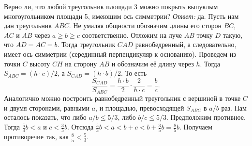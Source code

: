 \problem
Верно ли, что любой треугольник площади 3 можно покрыть выпуклым
многоугольником площади 5, имеющим ось симметрии?
\solution
\emph{Ответ:} да.
Пусть нам дан треугольник $ABC$.
Не умаляя общности обозначим длины его сторон $BC$, $AC$ и $AB$ через
$a \geq b \geq c$ соответственно.
Отложим на луче $AB$ точку $D$ такую, что $AD = AC = b$.
Тогда треугольник $CAD$ равнобедренный, а следовательно, имеет ось симметрии
(серединный перпендикуляр к основанию).
Проведем из точки $C$ высоту $CH$ на сторону $AB$ и обозначим её длину через
$h$.
Тогда $S_{ABC} = (h \cdot c) / 2$, а $S_{CAD} = (h \cdot b) / 2$.
То есть
\[
    \dfrac{S_{CAD}}{S_{ABC}}
=
    \dfrac{h \cdot b}{2} \cdot \dfrac{2}{h \cdot c}
=
    \dfrac{b}{c}
.\]
Аналогично можно построить равнобедренный треугольник с вершиной в точке $C$ и
двумя сторонами, равными $a$, и площадью, превосходящей $S_{ABC}$ в
$a / b$ раз.
Нам осталось показать, что либо $a / b \leq 5 / 3$, либо
$b / c \leq 5 / 3$.
Предположим противное.
Тогда $\frac{5}{3} b < a$ и $c < \frac{3}{5} b$.
Отсюда $\frac{5}{3} b < a < b + c < b + \frac{3}{5} b = \frac{8}{5} b$.
Получаем противоречие так, как $\frac{8}{5} < \frac{5}{3}$.
\endproblem
